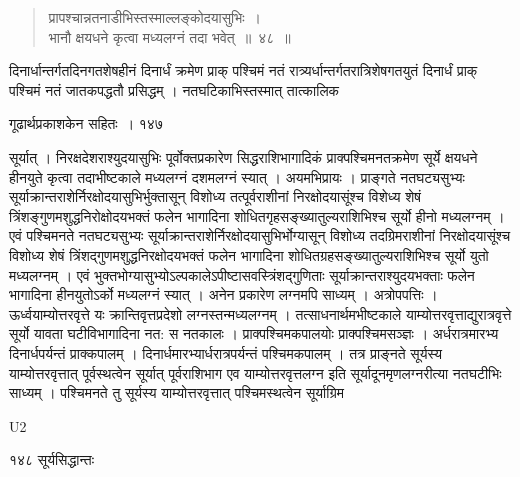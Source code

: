 \documentclass[11pt, openany]{book}
\begin{document}
\begin{quote}
  {\ssi प्रापश्चान्नतनाडीभिस्तस्माल्लङ्कोदयासुभिः~।\\
भानौ क्षयधने कृत्वा मध्यलग्नं तदा भवेत्~॥~४८~॥}
\end{quote}

\begin{sloppypar}
 दिनार्धान्तर्गतदिनगतशेषहीनं दिनार्धं क्रमेण प्राक् पश्चिमं नतं रात्र्यर्धान्तर्गतरात्रिशेषगतयुतं दिनार्धं प्राक् पश्चिमं नतं जातकपद्धतौ प्रसिद्धम् । नतघटिकाभिस्तस्मात् तात्कालिक\textendash
\end{sloppypar}

\newpage

\hspace{3cm}गूढार्थप्रकाशकेन सहितः~। \hfill १४७
\vspace{1cm}

\begin{sloppypar}
\noindent सूर्यात् । निरक्षदेशराश्युदयासुभिः पूर्वोक्तप्रकारेण सिद्धराशिभागादिकं प्राक्पश्चिमनतक्रमेण सूर्ये क्षयधने हीनयुते कृत्वा तदाभीष्टकाले मध्यलग्नं दशमलग्नं स्यात् । अयमभिप्रायः । प्राङ्गते नतघट्यसुभ्यः सूर्याक्रान्तराशेर्निरक्षोदयासुभिर्भुक्तासून् विशोध्य तत्पूर्वराशीनां निरक्षोदयासूंश्च विशेध्य शेषं त्रिंशङ्गुणमशुद्धनिरोक्षोदयभक्तं फलेन भागादिना शोधितगृहसङ्ख्यातुल्यराशिभिश्च सूर्यो हीनो मध्यलग्नम् । एवं पश्चिमनते नतघट्यसुभ्यः सूर्याक्रान्तराशेर्निरक्षोदयासुभिर्भोग्यासून् विशोध्य तदग्रिमराशीनां निरक्षोदयासूंश्च विशोध्य शेषं त्रिंशद्गुणमशुद्धनिरक्षोदयभक्तं फलेन भागादिना शोधितग्रहसङ्ख्यातुल्यराशिभिश्च सूर्यो युतो मध्यलग्नम् । एवं भुक्तभोग्यासुभ्योऽल्पकालेऽपीष्टासवस्त्रिंशद्गुणिताः सूर्याक्रान्तराश्युदयभक्ताः फलेन भागादिना हीनयुतोऽर्को मध्यलग्नं स्यात् । अनेन प्रकारेण लग्नमपि साध्यम् । अत्रोपपत्तिः । ऊर्ध्वयाम्योत्तरवृत्ते यः क्रान्तिवृत्तप्रदेशो लग्नस्तन्मध्यलग्नम् । तत्साधनार्थमभीष्टकाले याम्योत्तरवृत्ताद्युरात्रवृत्ते सूर्यो यावता घटीविभागादिना नत: स नतकालः । प्राक्पश्चिमकपालयोः प्राक्पश्चिमसञ्ज्ञः । अर्धरात्रमारभ्य दिनार्धपर्यन्तं प्राक्कपालम् । दिनार्धमारभ्यार्धरात्रपर्यन्तं पश्चिमकपालम् । तत्र प्राङ्नते सूर्यस्य याम्योत्तरवृत्तात् पूर्वस्थत्वेन सूर्यात् पूर्वराशिभाग एव याम्योत्तरवृत्तलग्न इति सूर्यादूनमृणलग्नरीत्या नतघटीभिः साध्यम् । पश्चिमनते तु सूर्यस्य याम्योत्तरवृत्तात् पश्चिमस्थत्वेन सूर्याग्रिम\textendash
\end{sloppypar}

{\tiny{U2}}

\newpage



\noindent १४८ \hspace{4cm} सूर्यसिद्धान्तः 
\vspace{1cm}
\end{document}

